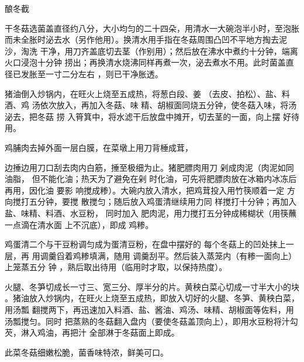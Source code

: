 \begin{recipe}{酿冬截}

\ingredients


\preparation

\step 干冬菇选菌盖直径约八分，大小均匀的二十四朵，用清水一大碗泡半小时，至泡胀
而未全胀时泌去水（另作他用）。换清水用手指在冬菇周围凸凹不平地方掏去泥沙，淘洗
干净，用刀齐盖底切去茎（作别用）；然后放在沸水中煮约十分钟，端离火口浸泡十分钟
捞出；再换清水烧沸同样再煮一次，泌去煮水不用。此时菌盖直径已发胀至一寸二分左右
，则已干净胀透。

猪油倒入炒锅内，在旺火上烧至五成热，将葱白段、姜 （去皮、拍松）、盐、料酒、鸡
汤依次放入，再加入冬菇、味 精、胡椒面同烧五分钟，使冬菇入味，将汤泌去，把冬菇
捞 入筲箕中，将水滤干后放盘中摊开，切去茎的一面，向上摆 好待用。

\step 鸡脯肉去掉外面一层白膜，在菜墩上用刀背棰成茸，

边捶边用刀口刮去肉内白筋，捶至极细为止。猪肥膘肉用刀 剁成肉泥（肉泥如同油脂，
但不能化油；热天为了避免在剁 时化油，可先将肥膘肉放在冰箱内冰冻后再用，因化油
要影 响搅成糁）。大碗内放入清水，把鸡茸投入用竹筷顺着一定 方向搅打五分钟，要搅
散搅匀；随后放入鸡蛋清继续用力同 样搅打十分钟；再加入盐、味精、料酒、水豆粉，
同时加入 肥肉泥，用力搅打五分钟成稀糊状（用筷蘸一点滴在清水面 上不沉底），即成
鸡糁。

鸡蛋清二个与干豆粉调匀成为蛋清豆粉，在盘中摆好的 每个冬菇上的凹处抹上一层，再
用调羹舀着鸡糁填满，随用 调羹刮平。然后装入蒸笼内（有糁一面向上）上笼蒸五分 钟
，熟后取出待用（临用时才取，以保持热度）。

\step 火腿、冬笋切成长一寸三、宽三分、厚半分的片。黄秧白菜心切成一寸半大小的块
。猪油放入炒锅内，在旺火上烧至五成热，即放入切好的火腿、冬笋、黄秧白菜，用汤瓢
翻搅两下，再迅速加入料酒、盐、酱油、鸡汤、味精、胡椒面等佐料，用汤瓢搅匀。同时
把蒸熟的冬菇翻入盘内（要使冬菇盖顶向上），即用水豆粉将汁勾芡，淋入鸡油，再把汁
全部淋于冬菇面上即成。

\features

此菜冬菇细嫩松脆，菌香味特浓，鲜美可口。

\end{recipe}

